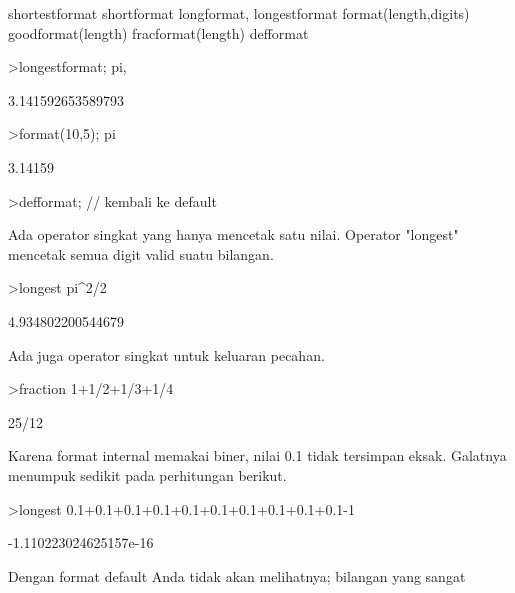 \documentclass[a4paper,10pt]{article}
\begin{document}
\begin{eulernotebook}
\begin{eulercomment}
\end{eulercomment}
\begin{eulerttcomment}
 shortestformat shortformat longformat, longestformat
 format(length,digits) goodformat(length)
 fracformat(length)
 defformat
\end{eulerttcomment}
\begin{eulerprompt}
>longestformat; pi,
\end{eulerprompt}
\begin{euleroutput}
  3.141592653589793
\end{euleroutput}
\begin{eulerprompt}
>format(10,5); pi
\end{eulerprompt}
\begin{euleroutput}
    3.14159 
\end{euleroutput}
\begin{eulerprompt}
>defformat; // kembali ke default
\end{eulerprompt}
\begin{eulercomment}
Ada operator singkat yang hanya mencetak satu nilai. Operator "longest"
mencetak semua digit valid suatu bilangan.
\end{eulercomment}
\begin{eulerprompt}
>longest pi^2/2
\end{eulerprompt}
\begin{euleroutput}
        4.934802200544679 
\end{euleroutput}
\begin{eulercomment}
Ada juga operator singkat untuk keluaran pecahan.
\end{eulercomment}
\begin{eulerprompt}
>fraction 1+1/2+1/3+1/4
\end{eulerprompt}
\begin{euleroutput}
  25/12
\end{euleroutput}
\begin{eulercomment}
Karena format internal memakai biner, nilai 0.1 tidak tersimpan eksak.
Galatnya menumpuk sedikit pada perhitungan berikut.
\end{eulercomment}
\begin{eulerprompt}
>longest 0.1+0.1+0.1+0.1+0.1+0.1+0.1+0.1+0.1+0.1-1
\end{eulerprompt}
\begin{euleroutput}
   -1.110223024625157e-16 
\end{euleroutput}
\begin{eulercomment}
Dengan format default Anda tidak akan melihatnya; bilangan yang sangat

\end{eulercomment}
\end{eulernotebook}
\end{document}
